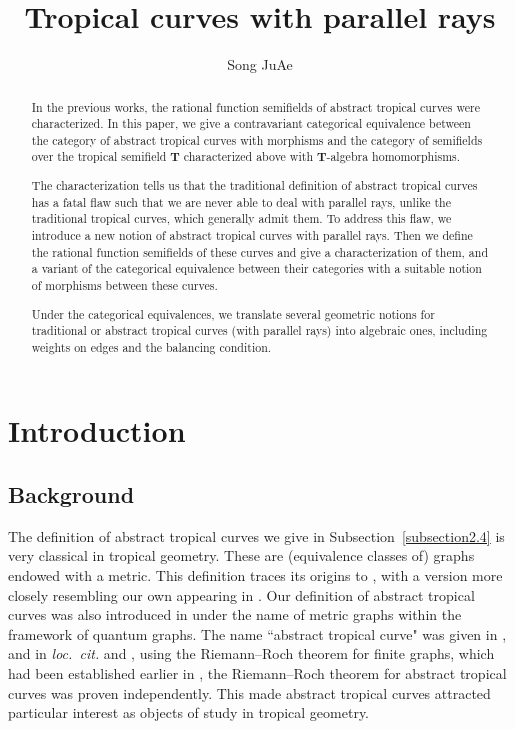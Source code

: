 \documentclass[a4paper,12pt]{amsart}
\title[Tropical curves with parallel rays]{Tropical curves with parallel rays}
\author{Song JuAe}
\begin{document}
\begin{abstract}
In the previous works, the rational function semifields of abstract tropical curves were characterized.
In this paper, we give a contravariant categorical equivalence between the category of abstract tropical curves with morphisms and the category of semifields over the tropical semifield $\boldsymbol{T}$ characterized above with $\boldsymbol{T}$-algebra homomorphisms.

The characterization tells us that the traditional definition of abstract tropical curves has a fatal flaw such that we are never able to deal with parallel rays, unlike the traditional tropical curves, which generally admit them.
To address this flaw, we introduce a new notion of abstract tropical curves with parallel rays.
Then we define the rational function semifields of these curves and give a characterization of them, and a variant of the categorical equivalence between their categories with a suitable notion of morphisms between these curves.

Under the categorical equivalences, we translate several geometric notions for traditional or abstract tropical curves (with parallel rays) into algebraic ones, including weights on edges and the balancing condition.
\end{abstract}

\maketitle

\tableofcontents

\section{Introduction}
	\label{section1}

\subsection*{Background}

The definition of abstract tropical curves we give in Subsection~\ref{subsection2.4} is very classical in tropical geometry.
These are (equivalence classes of) graphs endowed with a metric.
This definition traces its origins to \cite{Kirchhoff}, with a version more closely resembling our own appearing in \cite{Roth}.
Our definition of abstract tropical curves was also introduced in \cite{Kuchment} under the name of metric graphs within the framework of quantum graphs.
The name ``abstract tropical curve" was given in \cite{Mikhalkin=Zharkov}, and in \textit{loc.~cit.} and \cite{Gathmann=Kerber}, using the Riemann--Roch theorem for finite graphs, which had been established earlier in \cite{Baker=Norine}, the Riemann--Roch theorem for abstract tropical curves was proven independently.
This made abstract tropical curves attracted particular interest as objects of study in tropical geometry.
\end{document}
